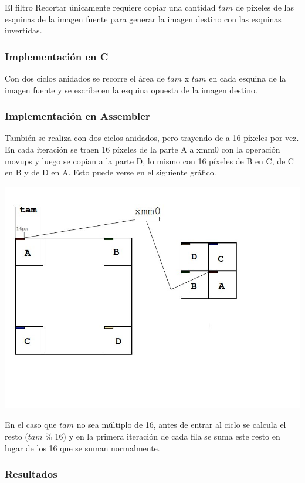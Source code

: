 El filtro Recortar únicamente requiere copiar una cantidad $tam$ de píxeles de las esquinas de la imagen fuente para generar la imagen destino con las esquinas invertidas.

\subsubsection{Implementación en C}

Con dos ciclos anidados se recorre el área de $tam$ x $tam$ en cada esquina de la imagen fuente y se escribe en la esquina opuesta de la imagen destino.

\subsubsection{Implementación en Assembler}

También se realiza con dos ciclos anidados, pero trayendo de a 16 píxeles por vez.
En cada iteración se traen 16 píxeles de la parte A a xmm0 con la operación movups y luego se copian a la parte D, lo mismo con 16 píxeles de B en C, de C en B y de D en A. Esto puede verse en el siguiente gráfico.

\includegraphics[width=\textwidth]{recortar.jpg} 

En el caso que $tam$ no sea múltiplo de 16, antes de entrar al ciclo se calcula el resto ($tam$ \% 16) y en la primera iteración de cada fila se suma este resto en lugar de los 16 que se suman normalmente. 

\subsubsection{Resultados}

